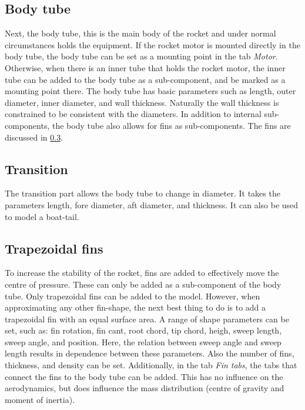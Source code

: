 \documentclass[11pt, a4paper]{article}
\begin{document}
\subsection{Body tube}

Next, the body tube, this is the main body of the rocket and under normal circumstances holds the equipment. If the rocket motor is mounted directly in the body tube, the body tube can be set as a mounting point in the tab \emph{Motor}. Otherwise, when there is an inner tube that holds the rocket motor, the inner tube can be added to the body tube as a sub-component, and be marked as a mounting point there. The body tube has basic parameters such as length, outer diameter, inner diameter, and wall thickness. Naturally the wall thickness is constrained to be consistent with the diameters. In addition to internal sub-components, the body tube also allows for fins as sub-components. The fins are discussed in \cref{subsec:fins}.

\subsection{Transition}

The transition part allows the body tube to change in diameter. It takes the parameters length, fore diameter, aft diameter, and thickness. It can also be used to model a boat-tail.

\subsection{Trapezoidal fins}  \label{subsec:fins}

To increase the stability of the rocket, fins are added to effectively move the centre of pressure. These can only be added as a sub-component of the body tube. Only trapezoidal fins can be added to the model. However, when approximating any other fin-shape, the next best thing to do is to add a trapezoidal fin with an equal surface area. A range of shape parameters can be set, such as: fin rotation, fin cant, root chord, tip chord, heigh, sweep length, sweep angle, and position. Here, the relation between sweep angle and sweep length results in dependence between these parameters. Also the number of fins, thickness, and density can be set. Additionally, in the tab \emph{Fin tabs}, the tabs that connect the fins to the body tube can be added. This has no influence on the aerodynamics, but does influence the mass distribution (centre of gravity and moment of inertia).
\end{document}
